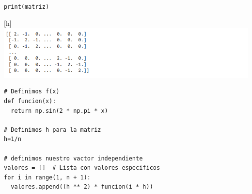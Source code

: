 \begin{homeworkProblem}
\begin{solucion}
\begin{enumerate}[a)]
\begin{lstlisting}
print(matriz)
          \end{lstlisting}
          \begin{center}[h]
            \includegraphics[scale=0.5]{code1.png}
          \end{center}
          \begin{lstlisting}
# Definimos f(x)
def funcion(x):
  return np.sin(2 * np.pi * x)
            
# Definimos h para la matriz
h=1/n
            
# definimos nuestro vactor independiente
valores = []  # Lista con valores especificos
for i in range(1, n + 1):
  valores.append((h ** 2) * funcion(i * h))
            

\end{lstlisting}
\end{enumerate}
\end{solucion}
\end{homeworkProblem}
